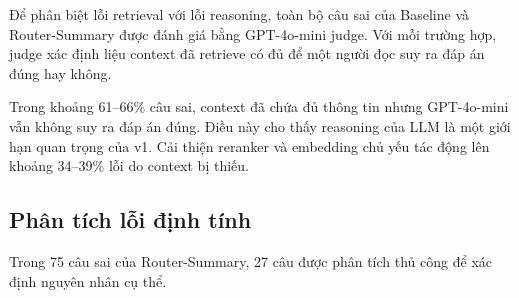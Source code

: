 \documentclass[../DoAn.tex]{subfiles}
\begin{document}
Để phân biệt lỗi retrieval với lỗi reasoning, toàn bộ câu sai của Baseline và Router-Summary được đánh giá bằng GPT-4o-mini judge. Với mỗi trường hợp, judge xác định liệu context đã retrieve có đủ để một người đọc suy ra đáp án đúng hay không.

\begin{table}[H]
    \centering
    \caption{Phân tích nguồn gốc lỗi của Baseline và Router-Summary}
    \label{tab:v1-error-source}
    {\small
    \setlength{\tabcolsep}{4pt}
    }
\end{table}

Trong khoảng 61--66\% câu sai, context đã chứa đủ thông tin nhưng GPT-4o-mini vẫn không suy ra đáp án đúng. Điều này cho thấy reasoning của LLM là một giới hạn quan trọng của v1. Cải thiện reranker và embedding chủ yếu tác động lên khoảng 34--39\% lỗi do context bị thiếu.

\subsection{Phân tích lỗi định tính}
\label{subsection:3.4.4}

Trong 75 câu sai của Router-Summary, 27 câu được phân tích thủ công để xác định nguyên nhân cụ thể.

\begin{table}[H]
    \centering
    \caption{Phân loại nguyên nhân lỗi trên 27 câu của Router-Summary}
    \label{tab:v1-qualitative-errors}
    {\small
    \setlength{\tabcolsep}{3pt}
    }
\end{table}
\end{document}
